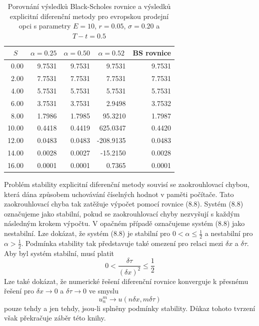 \documentclass[a4paper]{book}
\begin{document}
\begin{table}
\begin{center}
\begin{tabular}{r r r r r}
\multicolumn {1}{c}{$S$} &
\multicolumn {1}{c}{$\alpha = 0.25$} &
\multicolumn {1}{c}{$\alpha = 0.50$} &
\multicolumn {1}{c}{$\alpha = 0.52$} &
\multicolumn {1}{c}{BS rovnice} \\
\hline
 0.00 & 9.7531 & 9.7531 &    9.7531 & 9.7531 \\
 2.00 & 7.7531 & 7.7531 &    7.7531 & 7.7531 \\
 4.00 & 5.7531 & 5.7531 &    5.7531 & 5.7531 \\
 6.00 & 3.7531 & 3.7531 &    2.9498 & 3.7532 \\
 8.00 & 1.7986 & 1.7985 &   95.3210 & 1.7987 \\
10.00 & 0.4418 & 0.4419 &  625.0347 & 0.4420 \\
12.00 & 0.0483 & 0.0483 & -208.9135 & 0.0483 \\
14.00 & 0.0028 & 0.0027 &  -15.2150 & 0.0028 \\
16.00 & 0.0001 & 0.0001 &    0.7365 & 0.0001 \\
\hline
\end{tabular}
\end{center}
\caption{Porovnání výsledků Black-Scholes rovnice a výsledků explicitní diferenční metody pro evropskou prodejní opci s parametry $E=10$, $r=0.05$, $\sigma = 0.20$ a $T - t = 0.5$}
\end{table}
Problém stability explicitní diferenční metody souvisí se zaokrouhlovací chybou, která dána způsobem uchovávání číselných hodnot v paměti počítače. Tato zaokrouhlovací chyba tak zatěžuje výpočet pomocí rovnice (8.8). Systém (8.8) označujeme jako stabilní, pokud se zaokrouhlovací chyby nezvyšují s každým následným krokem výpočtu. V opačném případě označujeme systém (8.8) jako nestabilní. Lze dokázat, že systém (8.8) je stabilní pro $0 < \alpha \le \frac{1}{2}$ a nestabilní pro $\alpha > \frac{1}{2}$. Podmínka stability tak představuje také omezení pro relaci mezi $\delta x$ a $\delta \tau$. Aby byl systém stabilní, musí platit
\begin{equation*}
0 < \frac{\delta \tau}{(\delta x)^2} \le \frac{1}{2}
\end{equation*}
Lze také dokázat, že numerické řešení diferenční rovnice konverguje k přesnému řešení pro $\delta x \rightarrow 0$ a $\delta \tau \rightarrow 0$ ve smyslu
\begin{equation*}
u_n^m \rightarrow u(n \delta x, m \delta \tau)
\end{equation*}
pouze tehdy a jen tehdy, jsou-li splněny podmínky stability. Důkaz tohoto tvrzení však překračuje záběr této knihy.
\end{document}

